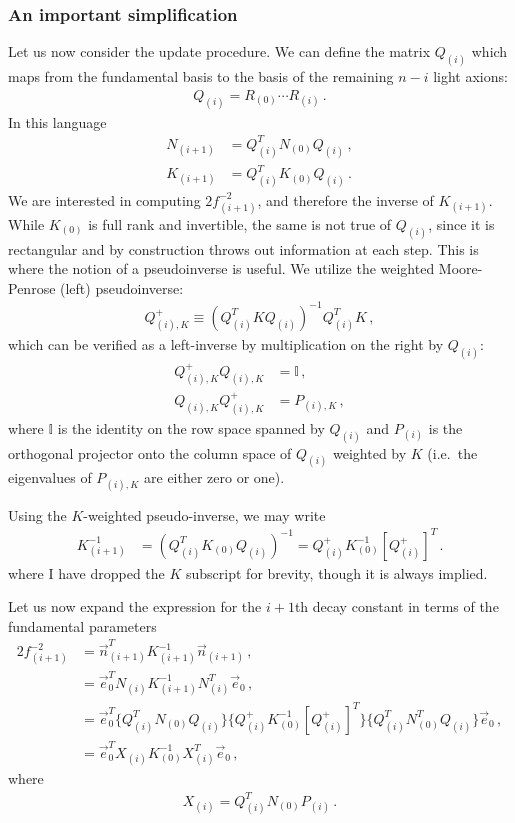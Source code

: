 \documentclass[11pt]{article}
\begin{document}
\subsubsection{An important simplification}
Let us now consider the update procedure. We can define the matrix $Q_{(i)}$ which maps from the fundamental basis to the basis of the remaining $n - i$ light axions:
\begin{align}
    Q_{(i)} = R_{(0)}\cdots R_{(i)}\,.
\end{align}
In this language
\begin{align}
    N_{(i + 1)} &= Q_{(i)}^T N_{(0)}Q_{(i)}\,,\\
    K_{(i + 1)} &= Q_{(i)}^T K_{(0)}Q_{(i)}\,.
\end{align}
We are interested in computing $2f_{(i + 1)}^{-2}$, and therefore the inverse of $K_{(i + 1)}$. While $K_{(0)}$ is full rank and invertible, the same is not true of $Q_{(i)}$, since it is rectangular and by construction throws out information at each step. This is where the notion of a pseudoinverse is useful. We utilize the weighted Moore-Penrose (left) pseudoinverse:
\begin{align}
    Q_{(i),K}^+\equiv(Q_{(i)}^T K Q_{(i)})^{-1}Q_{(i)}^TK\,,
\end{align}
which can be verified as a left-inverse by multiplication on the right by $Q_{(i)}$:
\begin{align}
    Q_{(i),K}^+Q_{(i),K}&= {\mathbb I}\,,\\
    Q_{(i),K}Q_{(i),K}^+&= P_{(i),K}\,,
\end{align}
where ${\mathbb I}$ is the identity on the row space spanned by $Q_{(i)}$ and $P_{(i)}$ is the orthogonal projector onto the column space of $Q_{(i)}$ weighted by $K$ (i.e.\ the eigenvalues of $P_{(i),K}$ are either zero or one).

Using the $K$-weighted pseudo-inverse, we may write
\begin{align}
    K_{(i + 1)}^{-1} &= (Q_{(i)}^TK_{(0)}Q_{(i)})^{-1}=Q_{(i)}^+K_{(0)}^{-1}[Q_{(i)}^+]^T\,.
\end{align}
where I have dropped the $K$ subscript for brevity, though it is always implied.

Let us now expand the expression for the $i+1$th decay constant in terms of the fundamental parameters
\begin{align}
    2 f_{(i + 1)}^{-2} &= \vec n_{(i + 1)}^TK_{(i + 1)}^{-1}\vec n_{(i + 1)}\,,\\
    &=\vec e_0^T N_{(i)} K_{(i + 1)}^{-1}N_{(i)}^T \vec e_0\,,\\
    &=\vec e_0^T \{Q_{(i)}^TN_{(0)}Q_{(i)}\} \{Q_{(i)}^+K_{(0)}^{-1}[Q_{(i)}^+]^T\}\{Q_{(i)}^TN_{(0)}^TQ_{(i)}\} \vec e_0\,,\\
    &=\vec e_0^T X_{(i)} K_{(0)}^{-1}X_{(i)}^T\vec e_0\,,
\end{align}
where
\begin{align}
    X_{(i)} = Q_{(i)}^T N_{(0)}P_{(i)}\,.
\end{align}
\end{document}
